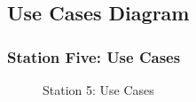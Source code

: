 \documentclass{beamer}
\begin{document}
\subsection{Use Cases Diagram}
\begin{frame}[fragile]
\frametitle{Station Five: Use Cases}
\begin{figure}
	\centering
	\caption{Station 5: Use Cases}
	\label{dia:usecase}
\end{figure}
\end{frame}
\end{document}
